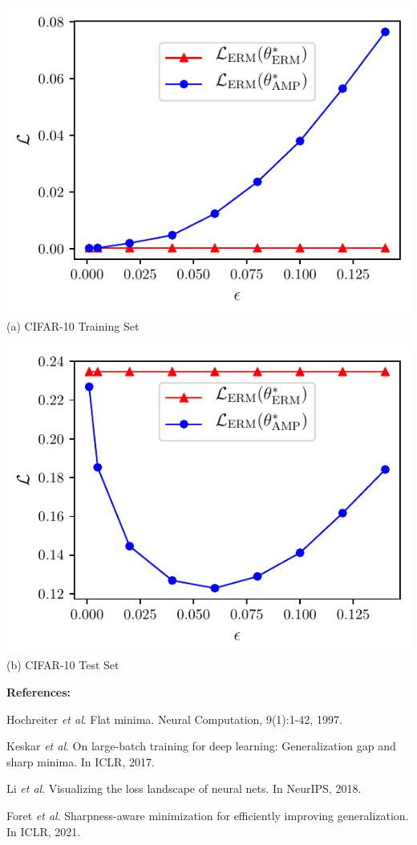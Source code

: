 \documentclass[landscape,a0paper,fontscale=0.3]{baposter}
\begin{document}
\begin{poster}
{\begin{minipage}{0.5\linewidth}
\begin{minipage}{0.5\linewidth}
\includegraphics[width=.95\linewidth]{figs/tune_a.pdf}
(a) CIFAR-10 Training Set
\vspace{1em}
\end{minipage}
\begin{minipage}{0.49\linewidth}
\centering
\includegraphics[width=.95\linewidth]{figs/tune_b.pdf}
(b) CIFAR-10 Test Set
\vspace{1em}
\end{minipage}
\textbf{\color{blue}References:}\\
\vspace{-1em}
\begin{enumerate}[label={[\arabic*]}]
    \item Hochreiter \textit{et al}. Flat minima. Neural Computation, 9(1):1-42, 1997.
    \item Keskar \textit{et al}. On large-batch training for deep learning: Generalization gap and sharp minima. In ICLR, 2017.
    \item Li \textit{et al}. Visualizing the loss landscape of neural nets. In NeurIPS, 2018.
    \item Foret \textit{et al}. Sharpness-aware minimization for efficiently improving generalization. In ICLR, 2021.
\end{enumerate}
\end{minipage}
}



\end{poster}
\end{document}
